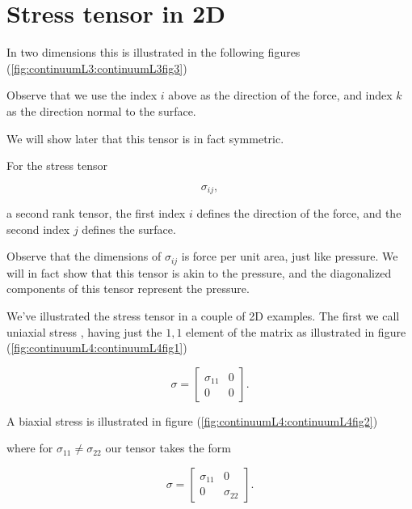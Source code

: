 \label{chap:continuumL4}
\section{Stress tensor in 2D}

In two dimensions this is illustrated in the following figures (\ref{fig:continuumL3:continuumL3fig3})

Observe that we use the index $i$ above as the direction of the force, and index $k$ as the direction normal to the surface.

We will show later that this tensor is in fact symmetric.

For the stress tensor

\begin{equation}\label{eqn:continuumL4:10}
\sigma_{ij},
\end{equation}

a second rank tensor, the first index $i$ defines the direction of the force, and the second index $j$ defines the surface.

Observe that the dimensions of $\sigma_{ij}$ is force per unit area, just like pressure.  We will in fact show that this tensor is akin to the pressure, and the diagonalized components of this tensor represent the pressure.

We've illustrated the stress tensor in a couple of 2D examples.  The first we call uniaxial stress , having just the $1,1$ element of the matrix as illustrated in figure (\ref{fig:continuumL4:continuumL4fig1})


\begin{equation}\label{eqn:continuumL4:30}
\sigma = 
\begin{bmatrix}
\sigma_{11} & 0 \\
0 & 0
\end{bmatrix}.
\end{equation}

A biaxial stress  is illustrated in figure (\ref{fig:continuumL4:continuumL4fig2})

where for $\sigma_{11} \ne \sigma_{22}$ our tensor takes the form

\begin{equation}\label{eqn:continuumL4:50}
\sigma = 
\begin{bmatrix}
\sigma_{11} & 0 \\
0 & \sigma_{22}
\end{bmatrix}.
\end{equation}

